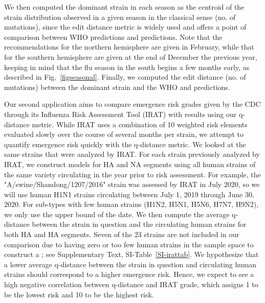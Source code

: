 \documentclass[onecolumn, compsoc,10pt]{IEEEtran}
\begin{document}

We then computed the dominant strain in each season as the centroid of the strain distribution observed in a given season in the classical sense (no. of mutations), since the edit distance metric is widely used and offers a point of comparison between WHO predictions and \qnet predictions. Note that the recommendations for the northern hemisphere are given in February, while that for the southern hemisphere are given at the end of December the previous year, keeping in mind that the flu season in the south begins a few months early, as described in Fig.~\ref{figseasonal}. Finally, we computed the edit distance (no. of mutations) between the dominant strain and the WHO and \qnet predictions.

Our second application aims to compare emergence risk grades given by the CDC through its Influenza Risk Assessment Tool (IRAT) with results using our q-distance metric. While IRAT uses a combination of 10 weighted risk elements evaluated slowly over the course of several months per strain, we attempt to quantify emergence risk quickly with the q-distance metric. We looked at the same strains that were analyzed by IRAT. For each strain previously analyzed by IRAT, we construct \qnet models for HA and NA segments using all human strains of the same variety circulating in the year prior to risk assessment. For example, the "A/swine/Shandong/1207/2016" strain was assessed by IRAT in July 2020, so we will use human H1N1 strains circulating between July 1, 2019 through June 30, 2020. For sub-types with few human strains (H1N2, H5N1, H5N6, H7N7, H9N2), we only use the upper bound of the date. We then compute the average q-distance between the strain in question and the circulating human strains for both HA and HA segments. Seven of the 23 strains are not included in our comparison due to having zero or too few human strains in the sample space to construct a \qnet; see Supplementary Text, SI-Table~\ref{SI-irattab}. We hypothesize that a lower average q-distance between the strain in question and circulating human strains should correspond to a higher emergence risk. Hence, we expect to see a high negative correlation between q-distance and IRAT grade, which assigns 1 to be the lowest risk and 10 to be the highest risk.
\end{document}
